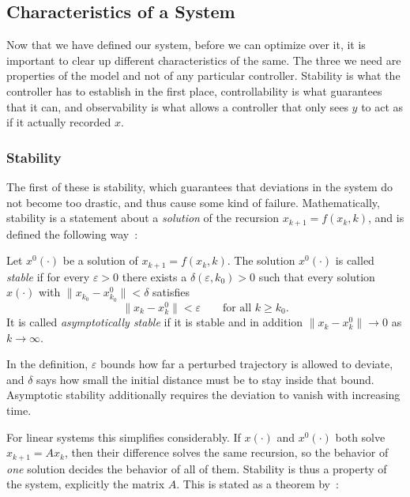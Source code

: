 \subsection{Characteristics of a System}
\label{subsec:characteristics}

Now that we have defined our system, before we can optimize over it, it
is important to clear up different characteristics of the same. The three we
need are properties of the model and not of any particular controller.
Stability is what the controller has to establish in the first place,
controllability is what guarantees that it can, and observability is what
allows a controller that only sees $y$ to act as if it actually recorded $x$.

\subsubsection{Stability}
\label{subsubsec:stability}

The first of these is stability, which guarantees that deviations in the system
do not become too drastic, and thus cause some kind of failure. Mathematically,
stability is a statement about a \emph{solution} of the recursion
$x_{k+1} = f(x_k, k)$, and is defined the following
way~:

\begin{definition}[Stability]
\label{def:stability}
Let $x^{0}(\cdot)$ be a solution of $x_{k+1} = f(x_k, k)$. The solution
$x^{0}(\cdot)$ is called \emph{stable} if for every $\varepsilon > 0$ there
exists a $\delta(\varepsilon, k_0) > 0$ such that every solution $x(\cdot)$ with
$\lVert x_{k_0} - x^{0}_{k_0} \rVert < \delta$ satisfies
\begin{equation*}
    \lVert x_k - x^{0}_k \rVert < \varepsilon
    \qquad \text{for all } k \ge k_0 .
\end{equation*}
It is called \emph{asymptotically stable} if it is stable and in addition
$\lVert x_k - x^{0}_k \rVert \to 0$ as $k \to \infty$.
\end{definition}

In the definition, $\varepsilon$ bounds how far a perturbed
trajectory is allowed to deviate, and $\delta$ says how small the initial
distance must be to stay inside that bound. Asymptotic stability additionally requires 
the deviation to vanish with increasing time.

For linear systems this simplifies considerably. If $x(\cdot)$ and $x^{0}(\cdot)$
both solve $x_{k+1} = A x_k$, then their difference solves the same recursion,
so the behavior of \emph{one} solution decides the behavior of all of them.
Stability is thus a property of the system, explicitly the matrix $A$. 
This is stated as a theorem by~:

